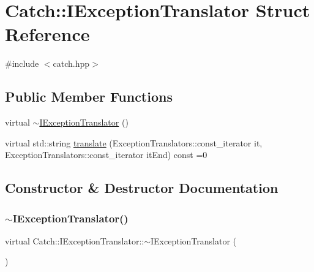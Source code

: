 \hypertarget{struct_catch_1_1_i_exception_translator}{}\section{Catch\+:\+:I\+Exception\+Translator Struct Reference}
\label{struct_catch_1_1_i_exception_translator}


{\ttfamily \#include $<$catch.\+hpp$>$}

\subsection*{Public Member Functions}
\begin{DoxyCompactItemize}
\item 
virtual \mbox{\hyperlink{struct_catch_1_1_i_exception_translator_afa00bb6258c07591df472aadae05783f}{$\sim$\+I\+Exception\+Translator}} ()
\item 
virtual std\+::string \mbox{\hyperlink{struct_catch_1_1_i_exception_translator_a2a554b96ed5ed411e7c796b6b42837a5}{translate}} (Exception\+Translators\+::const\+\_\+iterator it, Exception\+Translators\+::const\+\_\+iterator it\+End) const =0
\end{DoxyCompactItemize}


\subsection{Constructor \& Destructor Documentation}
\mbox{\label{struct_catch_1_1_i_exception_translator_afa00bb6258c07591df472aadae05783f}} 
\subsubsection{\texorpdfstring{$\sim$\+I\+Exception\+Translator()}{~IExceptionTranslator()}}
{\footnotesize\ttfamily virtual Catch\+::\+I\+Exception\+Translator\+::$\sim$\+I\+Exception\+Translator (\begin{DoxyParamCaption}{ }\end{DoxyParamCaption})\hspace{0.3cm}{\ttfamily [virtual]}}



